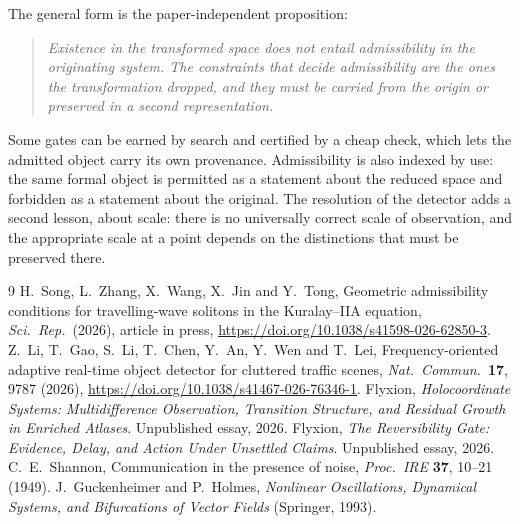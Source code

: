 \documentclass[11pt]{article}
\theoremstyle{definition}
\theoremstyle{remark}
\begin{document}
The general form is the paper-independent proposition:
\begin{quote}
\emph{Existence in the transformed space does not entail admissibility in the originating system. The constraints that decide admissibility are the ones the transformation dropped, and they must be carried from the origin or preserved in a second representation.}
\end{quote}
Some gates can be earned by search and certified by a cheap check, which lets the admitted object carry its own provenance. Admissibility is also indexed by use: the same formal object is permitted as a statement about the reduced space and forbidden as a statement about the original. The resolution of the detector adds a second lesson, about scale: there is no universally correct scale of observation, and the appropriate scale at a point depends on the distinctions that must be preserved there.

\begin{thebibliography}{9}
 H.~Song, L.~Zhang, X.~Wang, X.~Jin and Y.~Tong, Geometric admissibility conditions for travelling-wave solitons in the Kuralay--IIA equation, \emph{Sci.\ Rep.}\ (2026), article in press, \url{https://doi.org/10.1038/s41598-026-62850-3}.
 Z.~Li, T.~Gao, S.~Li, T.~Chen, Y.~An, Y.~Wen and T.~Lei, Frequency-oriented adaptive real-time object detector for cluttered traffic scenes, \emph{Nat.\ Commun.}\ \textbf{17}, 9787 (2026), \url{https://doi.org/10.1038/s41467-026-76346-1}.
 Flyxion, \emph{Holocoordinate Systems: Multidifference Observation, Transition Structure, and Residual Growth in Enriched Atlases}. Unpublished essay, 2026.
 Flyxion, \emph{The Reversibility Gate: Evidence, Delay, and Action Under Unsettled Claims}. Unpublished essay, 2026.
 C.~E.~Shannon, Communication in the presence of noise, \emph{Proc.\ IRE} \textbf{37}, 10--21 (1949).
 J.~Guckenheimer and P.~Holmes, \emph{Nonlinear Oscillations, Dynamical Systems, and Bifurcations of Vector Fields} (Springer, 1993).
\end{thebibliography}
\end{document}
